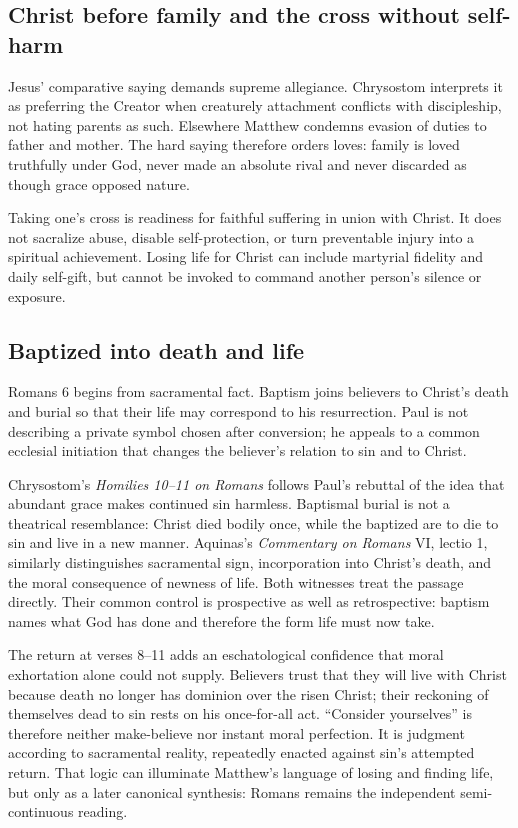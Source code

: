 \begin{deepstudy}
\subsection*{Christ before family and the cross without self-harm\enspace{}}

Jesus' comparative saying demands supreme allegiance. Chrysostom interprets it as preferring the Creator when creaturely attachment conflicts with discipleship, not hating parents as such. Elsewhere Matthew condemns evasion of duties to father and mother. The hard saying therefore orders loves: family is loved truthfully under God, never made an absolute rival and never discarded as though grace opposed nature.

Taking one's cross is readiness for faithful suffering in union with Christ. It does not sacralize abuse, disable self-protection, or turn preventable injury into a spiritual achievement. Losing life for Christ can include martyrial fidelity and daily self-gift, but cannot be invoked to command another person's silence or exposure.

\subsection*{Baptized into death and life\enspace{}}

Romans 6 begins from sacramental fact. Baptism joins believers to Christ's death and burial so that their life may correspond to his resurrection. Paul is not describing a private symbol chosen after conversion; he appeals to a common ecclesial initiation that changes the believer's relation to sin and to Christ.

Chrysostom's \emph{Homilies 10--11 on Romans} follows Paul's rebuttal of the idea that abundant grace makes continued sin harmless. Baptismal burial is not a theatrical resemblance: Christ died bodily once, while the baptized are to die to sin and live in a new manner. Aquinas's \emph{Commentary on Romans} VI, lectio 1, similarly distinguishes sacramental sign, incorporation into Christ's death, and the moral consequence of newness of life. Both witnesses treat the passage directly. Their common control is prospective as well as retrospective: baptism names what God has done and therefore the form life must now take.

The return at verses 8--11 adds an eschatological confidence that moral exhortation alone could not supply. Believers trust that they will live with Christ because death no longer has dominion over the risen Christ; their reckoning of themselves dead to sin rests on his once-for-all act. “Consider yourselves” is therefore neither make-believe nor instant moral perfection. It is judgment according to sacramental reality, repeatedly enacted against sin's attempted return. That logic can illuminate Matthew's language of losing and finding life, but only as a later canonical synthesis: Romans remains the independent semi-continuous reading.


\end{deepstudy}

